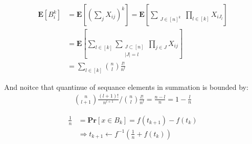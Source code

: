 \documentclass{article}
\newcommand{\prb}[1]{ \mathbf{Pr} \left[ {#1} \right]}
\newcommand{\expp}[1]{ \mathbf{E} \left[ {#1} \right]}
\newcommand{\xij} { X_{ij} }
\begin{document}
\begin{multicols*}{2}
  \begin{equation*}
    \begin{split}
      \expp{B_{i}^{k} } &= \expp{ \left( \sum_{j}{\xij } \right)^{k}  } =  \expp{ \sum_{ \substack { J \in [n]^k }  }{ \prod_{ l \in [k] } { X_{iJ_{l}} } }   } \\
      &=   \expp{ \sum_{l \in [k]}\sum_{ \substack { J \subset [n] \\ |J| = l }  }{ \prod_{j \in J} { \xij  }   }} \\
      &=   \sum_{l \in [k]}{  \binom{n}{l} \frac{l!  }{n^{l}} } 
    \end{split}
  \end{equation*}

  And noitce that quantinue of sequance elements in summation is bounded by:  
  \begin{equation*}
    \begin{split}
      \binom{n}{l+1} \frac{(l+1)!  }{n^{l+1}} /  \binom{n}{l} \frac{l!  }{n^{l}} = \frac{n-l}{n}=1-\frac{l}{n} 
    \end{split}
  \end{equation*}

  \begin{equation*}
    \begin{split}
      \frac{1}{n} &= \prb{ x \in B_{k} } = f\left( t_{k+1} \right)- f\left( t_{k} \right) \\
      & \Rightarrow t_{k+1} \leftarrow f^{-1}\left( \frac{1}{n} + f\left( t_{k} \right) \right) 
    \end{split}
  \end{equation*}



\end{multicols*}
\printbibliography 
\end{document}
